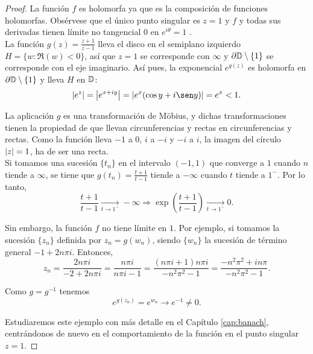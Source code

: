 \begin{proof}
    La función $f$ es holomorfa ya que es la composición de funciones holomorfas. Obsérvese que el único punto singular es $z = 1$ y $f$ y todas sus derivadas tienen límite no tangencial 0 en $e^{i \theta} = 1$ . \\

    La función $g(z) = \frac{z + 1}{z - 1}$ lleva el disco en el semiplano izquierdo $H = \{w: \Re (w) < 0\}$, así que $z = 1$ se corresponde con $\infty$ y $\partial \mathbb{D} \setminus \{1\}$ se corresponde con el eje imaginario. Así pues, la exponencial $e^{g(z)}$ es holomorfa en $\partial \mathbb{D} \setminus \{1\}$ y lleva $H$ en $\mathbb{D}$:
    \begin{equation*}
        \abs{e^z} = \abs{e^{x+iy}} = \abs{e^{x}(\cos y + i\sen y)} = e^{x} < 1.
    \end{equation*}

    La aplicación $g$ es una transformación de Möbius, y dichas transformaciones tienen la propiedad de que llevan circunferencias y rectas en circunferencias y rectas. Como la función lleva $-1$ a $0$, $i$ a $-i$ y $-i$ a $i$, la imagen del círculo $\left\lvert z\right\rvert=1$, ha de ser una recta. \\

    Si tomamos una sucesión $\{t_n\}$ en el intervalo $(-1,1)$ que converge a $1$ cuando $n$ tiende a $\infty$, se tiene que $g(t_n)  = \frac{t + 1}{t - 1}$ tiende a $- \infty$ cuando $t$ tiende a $1^-$. Por lo tanto,
    \begin{equation*}
        \frac{t + 1}{t - 1} \xrightarrow[t \to 1^-]{}  - \infty \Rightarrow \exp \left(  \frac{t + 1}{t - 1} \right) \xrightarrow[t \to 1^-]{} 0.
    \end{equation*}

    Sin embargo, la función $f$ no tiene límite en $1$. Por ejemplo, si tomamos la sucesión $\{z_n\}$ definida por $z_n = g(w_n)$, siendo $\{w_n\}$ la sucesión de término general $-1 + 2n \pi i$. Entonces,
     \begin{equation*}
         z_n = \frac{2n \pi i}{-2 + 2n \pi i} = \frac{n \pi i}{n \pi i - 1} =  \frac{(n \pi i + 1) n \pi i}{- n^2 \pi^2 - 1} = \frac{-n^2 \pi^2 + i n \pi}{-n^2 \pi^2 - 1}.
     \end{equation*}

     Como $g = g^{-1}$ tenemos
     \begin{equation*}
         e^{g(z_n)} = e^{w_n} \to e^{-1} \not = 0.
     \end{equation*}

     Estudiaremos este ejemplo con más detalle en el Capítulo \ref{cap:banach}, centrándonos de nuevo en el comportamiento de la función en el punto singular $z = 1$.
 \end{proof}
